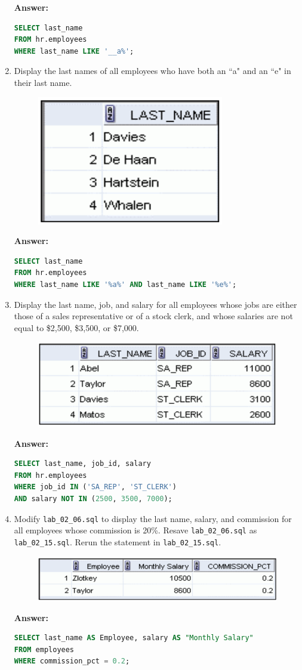 \documentclass[a4paper,12pt]{article}
\begin{document}
\begin{enumerate}
\textbf{Answer: }
    \begin{lstlisting}[language=SQL, label={lst:employees_data}]
SELECT last_name
FROM hr.employees
WHERE last_name LIKE '__a%';
    \end{lstlisting}
    \item Display the last names of all employees who have both an ``a" and an ``e" in their last name.
\begin{figure}[h]
    \centering
    \includegraphics*[width=.4\linewidth]{graphics/213.png}
\end{figure}

\textbf{Answer: }
    \begin{lstlisting}[language=SQL, label={lst:employees_data}]
SELECT last_name
FROM hr.employees
WHERE last_name LIKE '%a%' AND last_name LIKE '%e%';
    \end{lstlisting}
    \item Display the last name, job, and salary for all employees whose jobs are either those of a sales
representative or of a stock clerk, and whose salaries are not equal to \$2,500, \$3,500, or \$7,000.
\begin{figure}[h]
    \centering
    \includegraphics*[width=.4\linewidth]{graphics/214.png}
\end{figure}

\textbf{Answer: }
    \begin{lstlisting}[language=SQL, label={lst:employees_data}]
SELECT last_name, job_id, salary
FROM hr.employees
WHERE job_id IN ('SA_REP', 'ST_CLERK')
AND salary NOT IN (2500, 3500, 7000);
    \end{lstlisting}
    \item Modify \texttt{lab\_02\_06.sql} to display the last name, salary, and commission for all employees
whose commission is 20\%. Resave \texttt{lab\_02\_06.sql} as \texttt{lab\_02\_15.sql}. Rerun the
statement in \texttt{lab\_02\_15.sql}.
\begin{figure}[h]
    \centering
    \includegraphics*[width=.4\linewidth]{graphics/215.png}
\end{figure}

\textbf{Answer: }
    \begin{lstlisting}[language=SQL, label={lst:employees_data}]
SELECT last_name AS Employee, salary AS "Monthly Salary"
FROM employees
WHERE commission_pct = 0.2;
    \end{lstlisting}
\end{enumerate}
\end{document}
